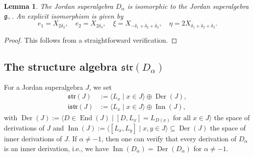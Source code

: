 \documentclass{amsart}
\newtheorem{lemma}[theorem]{Lemma}
\numberwithin{theorem}{section}
\theoremstyle{definition}
\theoremstyle{remark}
\DeclareMathOperator{\Inn}{Inn}
\DeclareMathOperator{\End}{End}
\newcommand{\mf}[1]{\mathfrak{#1}}
\newcommand{\dea}{{\delta_1}}
\newcommand{\deb}{{\delta_2}}
\newcommand{\dec}{{\delta_3}}
\newcommand{\plus}{\scalebox{0.6}{{\rm+}}}
\DeclareMathOperator{\Der}{Der}
\begin{document}
\begin{lemma} \label{Inverse TKK}
The Jordan superalgebra $D_\alpha$ is isomorphic to the Jordan superalgebra $\mf g_{\plus}$. An explicit isomorphism is given by
\[
e_1=X_{2\deb}, \quad e_2=X_{2\dec},\quad \xi= X_{-\dea+\deb+\dec}, \quad \eta= 2X_{\dea+\deb+\dec}.
\]
\end{lemma}

\begin{proof}
This follows from a straightforward verification.
\end{proof}

\subsection{The structure algebra $\mathfrak{str}(D_\alpha)$}
\begingroup
\allowdisplaybreaks
For a Jordan superalgebra $J$, we set
\begin{align*}
\mf{str}(J) &:= \langle L_x \mid x\in J \rangle \oplus \Der(J),\\
\mf{istr}(J) &:= \langle L_x \mid x\in J \rangle \oplus \Inn(J),
\end{align*}
with $\Der(J) := \langle D\in \End(J) \mid [D,L_x] = L_{D(x)} \text{ for all } x\in J \rangle$ the space of derivations of $J$ and  $\Inn(J) := \langle [L_x,L_y] \mid x,y\in J \rangle\subseteq \Der(J)$ the space of inner derivations of $J$. If $\alpha\neq -1$, then one can verify that every derivation of $D_\alpha$ is an inner derivation, i.e., we have $\Inn(D_\alpha) = \Der(D_\alpha)$ for $\alpha\neq -1$.
\end{document}
